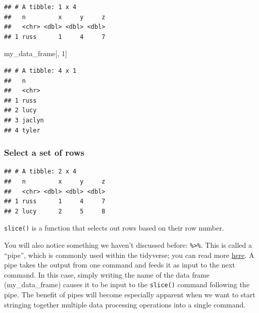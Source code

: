 \documentclass[12pt,]{book}
\newenvironment{Shaded}{\begin{snugshade}}{\end{snugshade}}
\newcommand{\DecValTok}[1]{\textcolor[rgb]{0.00,0.00,0.81}{#1}}
\newcommand{\KeywordTok}[1]{\textcolor[rgb]{0.13,0.29,0.53}{\textbf{#1}}}
\newcommand{\NormalTok}[1]{#1}
\newcommand{\OperatorTok}[1]{\textcolor[rgb]{0.81,0.36,0.00}{\textbf{#1}}}
\newcommand{\StringTok}[1]{\textcolor[rgb]{0.31,0.60,0.02}{#1}}
\begin{document}
\begin{verbatim}
## # A tibble: 1 x 4
##   n         x     y     z
##   <chr> <dbl> <dbl> <dbl>
## 1 russ      1     4     7
\end{verbatim}

\begin{Shaded}
\begin{Highlighting}[]
\NormalTok{my_data_frame[, }\DecValTok{1}\NormalTok{]}
\end{Highlighting}
\end{Shaded}

\begin{verbatim}
## # A tibble: 4 x 1
##   n     
##   <chr> 
## 1 russ  
## 2 lucy  
## 3 jaclyn
## 4 tyler
\end{verbatim}

\hypertarget{select-a-set-of-rows}{%
\subsubsection{Select a set of rows}\label{select-a-set-of-rows}}

\begin{Shaded}
\end{Shaded}

\begin{verbatim}
## # A tibble: 2 x 4
##   n         x     y     z
##   <chr> <dbl> <dbl> <dbl>
## 1 russ      1     4     7
## 2 lucy      2     5     8
\end{verbatim}

\texttt{slice()} is a function that selects out rows based on their row number.

You will also notice something we haven't discussed before: \texttt{\%\textgreater{}\%}. This is called a ``pipe'', which is commonly used within the tidyverse; you can read more \href{http://magrittr.tidyverse.org/}{here}. A pipe takes the output from one command and feeds it as input to the next command. In this case, simply writing the name of the data frame (my\_data\_frame) causes it to be input to the \texttt{slice()} command following the pipe. The benefit of pipes will become especially apparent when we want to start stringing together multiple data processing operations into a single command.
\end{document}
